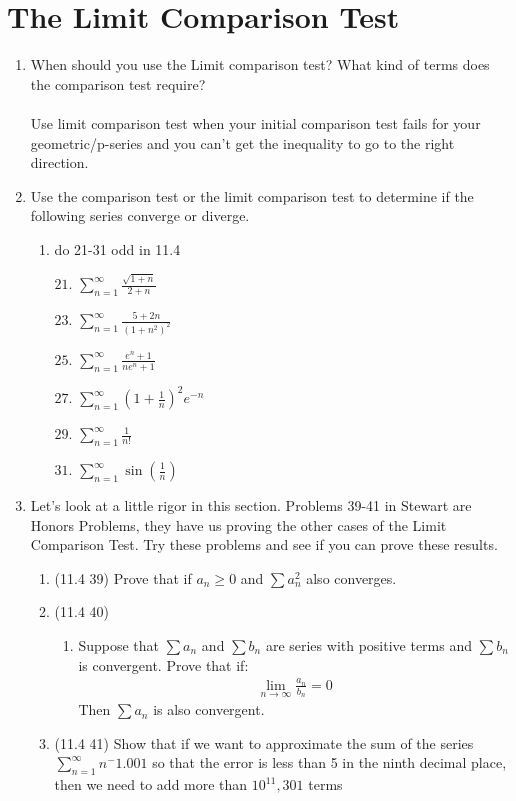 \documentclass[12pt]{article}
\begin{document}
\newpage\section{The Limit Comparison Test}
\begin{enumerate}
     \addtocounter{enumi}{22}\item When should you use the Limit comparison test? What kind of terms does the comparison test require?
     \\\\Use limit comparison test when your initial comparison test fails for your geometric/p-series and you can't get the inequality to go to the right direction.
     \item Use the comparison test or the limit comparison test to determine if the following series converge or diverge.
     \begin{enumerate}
         \item do 21-31 odd in 11.4
         \item[$21.$]$\sum^\infty_{n=1}\frac{\sqrt{1+n}}{2+n}$
         \item[$23.$]$\sum^\infty_{n=1}\frac{5+2n}{(1+n^2)^2}$
         \item[$25.$]$\sum^\infty_{n=1}\frac{e^n+1}{ne^n+1}$
         \item[$27.$]$\sum^\infty_{n=1}\left(1+\frac{1}{n}\right)^2e^{-n}$
         \item[$29.$]$\sum^\infty_{n=1}\frac{1}{n!}$         \item[$31.$]$\sum^\infty_{n=1}\sin{\left(\frac{1}{n}\right)}$ 
         
     \end{enumerate}
     \item Let's look at a little rigor in this section. Problems 39-41 in Stewart are Honors Problems, they have us proving the other cases of the Limit Comparison Test. Try these problems and see if you can prove these results.
     \begin{enumerate}
         \item (11.4 39) 
         Prove that if $a_n \geq 0$ and $\sum a_n^2$ also converges.
         \item (11.4 40)
         \begin{enumerate}
             \item Suppose that $\sum a_n$ and $\sum b_n$ are series with positive terms and $\sum b_n$ is convergent. Prove that if:
            \begin{gather*}
                \lim_{n\to\infty}\frac{a_n}{b_n}=0
            \end{gather*}   
            Then $\sum a_n$ is also convergent.
         \end{enumerate}
         \item (11.4 41) Show that if we want to approximate the sum of the series $\sum_{n=1}^\infty n^-1.001$ so that the error is less than 5 in the ninth decimal place, then we need to add more than $10^11,301$ terms
     \end{enumerate}
\end{enumerate}
\end{document}
